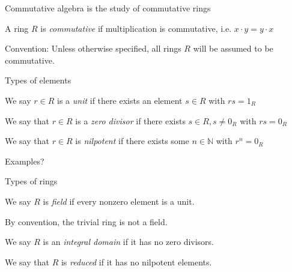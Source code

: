 \documentclass{beamer}
\begin{document}
\begin{frame}{Commutative algebra is the study of commutative rings}

\begin{definition}
A ring $R$ is \emph{commutative} if multiplication is commutative, i.e. $x\cdot y=y\cdot x$
\end{definition}

\begin{block}{Convention:}
Unless otherwise specified, all rings $R$ will be assumed to be commutative.
\end{block}
\end{frame}



\begin{frame}{Types of elements}


\begin{definition}
We say $r\in R$ is a \emph{unit} if there exists an element $s\in R$ with $rs=1_R$
\end{definition}

\begin{definition}
We say that $r\in R$ is a \emph{zero divisor} if there exists $s\in R, s\neq 0_R$ with $rs=0_R$
\end{definition}

\begin{definition}
We say that $r\in R$ is \emph{nilpotent} if there exists some $n\in\mathbb{N}$ with $r^n=0_R$
\end{definition}

\begin{block}{Examples?}
 \end{block}

\end{frame}


\begin{frame}{Types of rings}

\begin{definition}
We say $R$ is \emph{field} if every nonzero element is a unit.
\end{definition}
By convention, the trivial ring is not a field.
\begin{definition}
We say $R$ is an \emph{integral domain} if it has no zero divisors.
\end{definition}

\begin{definition}
We say that $R$ is \emph{reduced} if it has no nilpotent elements.
\end{definition}


\end{frame}
\end{document}
